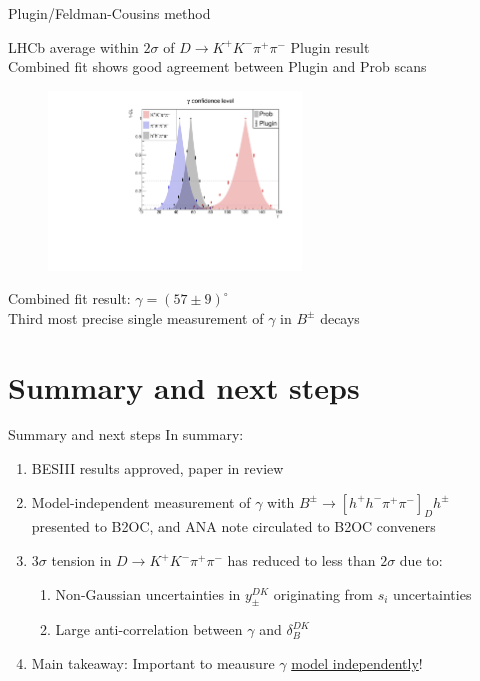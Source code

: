 \documentclass{beamer}
\begin{document}
\begin{frame}{Plugin/Feldman-Cousins method}
  \begin{center}
    LHCb average within $2\sigma$ of $D\to K^+K^-\pi^+\pi^-$ Plugin result \\
    Combined fit shows good agreement between Plugin and Prob scans
  \end{center}
  \begin{figure}
    \centering
    \includegraphics[width=0.6\textwidth]{Plots/gamma_plugin_scan.pdf}
  \end{figure}
  \vspace{-0.3cm}
  \begin{center}
    Combined fit result: $\gamma = (57 \pm 9)^\circ$\\
    Third most precise single measurement of $\gamma$ in $B^\pm$ decays
  \end{center}
\end{frame}

\section{Summary and next steps}

\begin{frame}{Summary and next steps}
  \vspace{0.0cm}
  {\Large In summary:}
  \vspace{0.5cm}
  \begin{enumerate}
    \setlength\itemsep{1.0em}
    \item{BESIII results approved, paper in review}
    \item{Model-independent measurement of $\gamma$ with $B^\pm\to[h^+h^-\pi^+\pi^-]_Dh^\pm$ presented to B2OC, and ANA note circulated to B2OC conveners}
    \item{$3\sigma$ tension in $D\to K^+K^-\pi^+\pi^-$ has reduced to less than $2\sigma$ due to:}
    \begin{enumerate}
      \item{Non-Gaussian uncertainties in $y_\pm^{DK}$ originating from $s_i$ uncertainties}
      \item{Large anti-correlation between $\gamma$ and $\delta_B^{DK}$}
    \end{enumerate}
    \item{Main takeaway: Important to meausure $\gamma$ \underline{model independently}!}
  \end{enumerate}
\end{frame}
\end{document}
